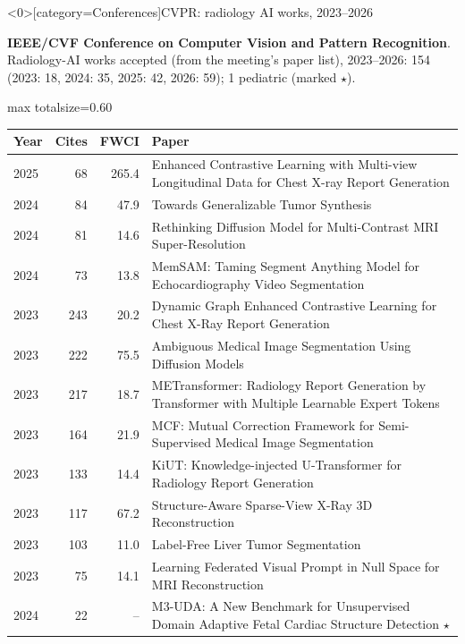 \documentclass[aspectratio=169]{beamer}
\renewcommand{\arraystretch}{1.08}
\begin{document}
\begin{frame}<0>[category=Conferences]{CVPR: radiology AI works, 2023--2026}
{\scriptsize \textbf{IEEE/CVF Conference on Computer Vision and Pattern Recognition}. Radiology-AI works accepted (from the meeting's paper list), 2023--2026: 154 (2023: 18, 2024: 35, 2025: 42, 2026: 59); 1 pediatric (marked $\star$).\par}\vspace{2pt}
\tiny
\begin{adjustbox}{max totalsize={\textwidth}{0.60\textheight}}
\renewcommand{\arraystretch}{1.2}
\begin{tabular}{|l|r|r|>{\raggedright\arraybackslash}p{}|}
\hline \textbf{Year} & \textbf{Cites} & \textbf{FWCI} & \textbf{Paper} \\ \hline
2025 & 68 & 265.4 & Enhanced Contrastive Learning with Multi-view Longitudinal Data for Chest X-ray Report Generation \\ \hline
2024 & 84 & 47.9 & Towards Generalizable Tumor Synthesis \\ \hline
2024 & 81 & 14.6 & Rethinking Diffusion Model for Multi-Contrast MRI Super-Resolution \\ \hline
2024 & 73 & 13.8 & MemSAM: Taming Segment Anything Model for Echocardiography Video Segmentation \\ \hline
2023 & 243 & 20.2 & Dynamic Graph Enhanced Contrastive Learning for Chest X-Ray Report Generation \\ \hline
2023 & 222 & 75.5 & Ambiguous Medical Image Segmentation Using Diffusion Models \\ \hline
2023 & 217 & 18.7 & METransformer: Radiology Report Generation by Transformer with Multiple Learnable Expert Tokens \\ \hline
2023 & 164 & 21.9 & MCF: Mutual Correction Framework for Semi-Supervised Medical Image Segmentation \\ \hline
2023 & 133 & 14.4 & KiUT: Knowledge-injected U-Transformer for Radiology Report Generation \\ \hline
2023 & 117 & 67.2 & Structure-Aware Sparse-View X-Ray 3D Reconstruction \\ \hline
2023 & 103 & 11.0 & Label-Free Liver Tumor Segmentation \\ \hline
2023 & 75 & 14.1 & Learning Federated Visual Prompt in Null Space for MRI Reconstruction \\ \hline
2024 & 22 & -- & M3-UDA: A New Benchmark for Unsupervised Domain Adaptive Fetal Cardiac Structure Detection $\star$ \\ \hline
\end{tabular}
\end{adjustbox}
\\[2pt]
\end{frame}
\end{document}
